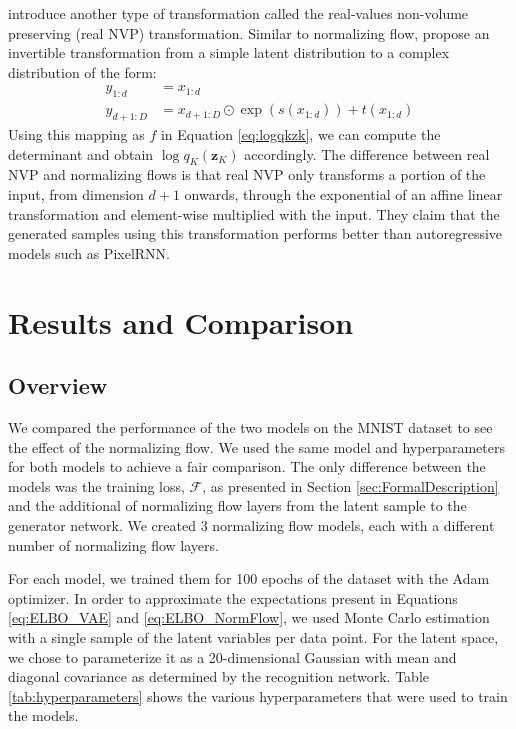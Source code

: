 \documentclass{article}
\newcommand{\bz}{\mathbf{z}}
\begin{document}
\citet{D16} introduce another type of transformation called the real-values non-volume preserving (real NVP) 
transformation. Similar to normalizing flow, \citet{D16} propose an invertible transformation from a simple
latent distribution to a complex distribution of the form:
\begin{align}
	y_{1:d} &= x_{1:d} \\
	y_{d+1:D} &= x_{d+1:D} \odot \exp\left(s(x_{1:d})\right) + t\left(x_{1:d}\right)
\end{align}
Using this mapping as $f$ in Equation \ref{eq:logqkzk}, we can compute the determinant and 
obtain $\log q_K(\bz_K)$ accordingly. The difference between real NVP and normalizing flows is that 
real NVP only transforms a portion of the input, from dimension $d+1$ onwards, through the exponential 
of an affine linear transformation and element-wise multiplied with the input. They claim that the generated 
samples using this transformation performs better than autoregressive models such as PixelRNN.

\section{Results and Comparison}

\subsection{Overview}
We compared the performance of the two models on the MNIST dataset to see the effect of the normalizing
flow. We used the same model and hyperparameters for both models to achieve a fair comparison. The only 
difference between the models was the training loss, $\mathcal{F}$, as presented in Section 
\ref{sec:FormalDescription} and the additional of normalizing flow layers from the latent sample to the 
generator network. We created 3 normalizing flow models, each with a different number of normalizing flow layers.

For each model, we trained them for 100 epochs of the dataset with the Adam optimizer. In order to approximate 
the expectations present in Equations \ref{eq:ELBO_VAE} and \ref{eq:ELBO_NormFlow}, we used Monte Carlo 
estimation with a single sample of the latent variables per data point. For the latent space, we chose to 
parameterize it as a 20-dimensional Gaussian with mean and diagonal covariance as determined by the 
recognition network. Table \ref{tab:hyperparameters} shows the various hyperparameters that were used to
train the models.
\end{document}
